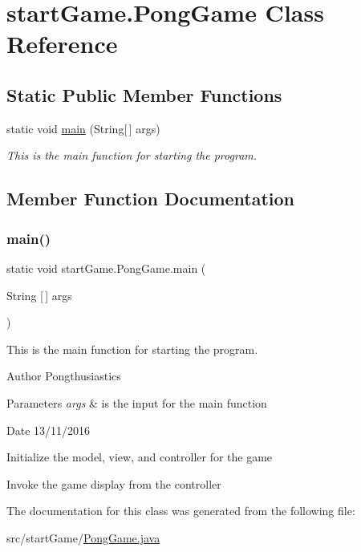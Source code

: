 \hypertarget{classstart_game_1_1_pong_game}{}\section{start\+Game.\+Pong\+Game Class Reference}
\label{classstart_game_1_1_pong_game}
\subsection*{Static Public Member Functions}
\begin{DoxyCompactItemize}
\item 
static void \hyperlink{classstart_game_1_1_pong_game_ad6566aa79da5e43aa9fda10658f8374e}{main} (String\mbox{[}$\,$\mbox{]} args)
\begin{DoxyCompactList}\small\item\em This is the main function for starting the program. \end{DoxyCompactList}\end{DoxyCompactItemize}


\subsection{Member Function Documentation}
\hypertarget{classstart_game_1_1_pong_game_ad6566aa79da5e43aa9fda10658f8374e}{}\label{classstart_game_1_1_pong_game_ad6566aa79da5e43aa9fda10658f8374e} 
\subsubsection{\texorpdfstring{main()}{main()}}
{\footnotesize\ttfamily static void start\+Game.\+Pong\+Game.\+main (\begin{DoxyParamCaption}\item[{String \mbox{[}$\,$\mbox{]}}]{args }\end{DoxyParamCaption})\hspace{0.3cm}{\ttfamily [static]}}



This is the main function for starting the program. 

\begin{DoxyAuthor}{Author}
Pongthusiastics 
\end{DoxyAuthor}

\begin{DoxyParams}{Parameters}
{\em args} & is the input for the main function \\
\hline
\end{DoxyParams}
\begin{DoxyDate}{Date}
13/11/2016 
\end{DoxyDate}
Initialize the model, view, and controller for the game

Invoke the game display from the controller

The documentation for this class was generated from the following file\+:\begin{DoxyCompactItemize}
\item 
src/start\+Game/\hyperlink{_pong_game_8java}{Pong\+Game.\+java}\end{DoxyCompactItemize}
